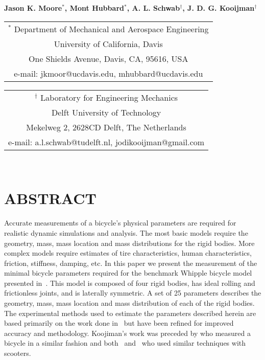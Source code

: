 \documentclass{bmd2010p}
\begin{document}
\begin{center}
\end{center}

\begin{center}
\normalsize{\bf{Jason K. Moore$^{*}$, Mont Hubbard$^{*}$, A. L. Schwab$^\dag$,
            J. D. G. Kooijman$^\dag$}}
\end{center}

\begin{center}
\begin{tabular}{c}
$^*$ Department of Mechanical and Aerospace Engineering\\
University of California, Davis\\
One Shields Avenue, Davis, CA, 95616, USA\\
e-mail: jkmoor@ucdavis.edu, mhubbard@ucdavis.edu\\
\end{tabular}
\begin{tabular}{c}
$^\dag$ Laboratory for Engineering Mechanics\\
Delft University of Technology\\
Mekelweg 2, 2628CD Delft, The Netherlands\\
e-mail: a.l.schwab@tudelft.nl, jodikooijman@gmail.com\\
\end{tabular} \\ \vspace{2.5ex}
\end{center}
\section*{ABSTRACT}
Accurate measurements of a bicycle's physical parameters are required for
realistic dynamic simulations and analysis. The most basic models require the
geometry, mass, mass location and mass distributions for the rigid bodies. More
complex models require estimates of tire characteristics, human
characteristics, friction, stiffness, damping, etc. In this
paper we present the measurement of the minimal bicycle parameters required for
the benchmark Whipple bicycle model presented in~\cite{Meijaard2007}. This
model is composed of four rigid bodies, has ideal rolling and frictionless joints,
and is laterally symmetric. A set of 25 parameters describes the
geometry, mass, mass location and mass distribution of each of the rigid
bodies. The experimental methods used to estimate the parameters described
herein are based primarily on the work done in~\cite{Kooijman2006} but have
been refined for improved accuracy and methodology. Koojiman's work was
preceded by \cite{Roland1971} who measured a bicycle in a
similar fashion and both~\cite{Dohring1953} and~\cite{Singh1971} who used
similar techniques with scooters.
\end{document}
